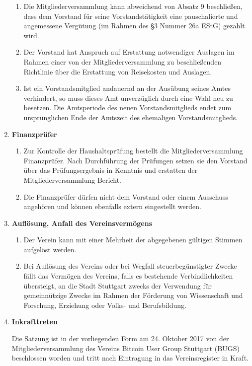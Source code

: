 \documentclass[a4paper,11pt]{article}
\begin{document}
\begin{enumerate}[§ 1.]
\begin{enumerate}[1.]
\item Die Mitgliederversammlung kann abweichend von Absatz 9 beschließen, dass dem Vorstand
für seine Vorstandstätigkeit eine pauschalierte und angemessene Vergütung (im Rahmen des
§3 Nummer 26a EStG) gezahlt wird.
\item Der Vorstand hat Anspruch auf Erstattung notwendiger Auslagen im Rahmen einer von der
Mitgliederversammlung zu beschließenden Richtlinie über die Erstattung von Reisekosten und
Auslagen.
\item Ist ein Vorstandsmitglied andauernd an der Ausübung seines Amtes verhindert, so muss
dieses Amt unverzüglich durch eine Wahl neu zu besetzen. Die Amtsperiode des neuen Vorstandsmitglieds endet zum ursprünglichen Ende der Amtszeit des ehemaligen Vorstandsmitglieds.
\end{enumerate}

\item \textsf{\textbf{Finanzprüfer}}
\begin{enumerate}[1.]
\item Zur Kontrolle der Haushaltsprüfung bestellt die Mitgliederversammlung Finanzprüfer. Nach Durchführung der Prüfungen setzen sie den Vorstand über das Prüfungsergebnis in Kenntnis und erstatten der Mitgliederversammlung Bericht.
\item Die Finanzprüfer dürfen nicht dem Vorstand oder einem Ausschuss angehören und können ebenfalls extern eingestellt werden.
\end{enumerate}

\item \textsf{\textbf{Auflösung, Anfall des Vereinsvermögens}}
\begin{enumerate}[1.]
\item Der Verein kann mit einer  Mehrheit der abgegebenen gültigen Stimmen aufgelöst werden.
\item Bei Auflösung des Vereins oder bei Wegfall steuerbegünstigter Zwecke fällt das Vermögen des
Vereins, falls es bestehende Verbindlichkeiten übersteigt, an die Stadt Stuttgart zwecks der Verwendung für gemeinnützige Zwecke im Rahmen der Förderung von Wissenschaft und Forschung, Erziehung oder Volks- und Berufsbildung.
\end{enumerate}

\item \textsf{\textbf{Inkrafttreten}}

Die Satzung ist in der vorliegenden Form am 24. Oktober 2017 von der Mitgliederversammlung des Vereins Bitcoin User Group Stuttgart (BUGS) beschlossen worden und tritt nach Eintragung in das Vereinsregister in Kraft.

\end{enumerate}

\end{document}
